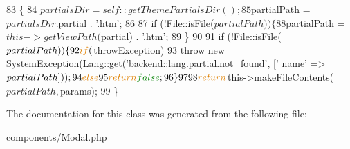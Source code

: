 \begin{DoxyCode}
83     \{   
84         $partialsDir = self::getThemePartialsDir();
85         $partialPath = $partialsDir . $partial . \textcolor{stringliteral}{'.htm'};
86 
87         \textcolor{keywordflow}{if} (!File::isFile($partialPath)) \{
88             $partialPath = $this->getViewPath($partial) . \textcolor{stringliteral}{'.htm'};
89         \}
90 
91         \textcolor{keywordflow}{if} (!File::isFile($partialPath)) \{
92             \textcolor{keywordflow}{if} ($throwException)
93                 \textcolor{keywordflow}{throw} \textcolor{keyword}{new} \hyperlink{namespaceSystemException}{SystemException}(Lang::get(\textcolor{stringliteral}{'backend::lang.partial.not\_found'}, [\textcolor{stringliteral}{'
      name'} => $partialPath]));
94             \textcolor{keywordflow}{else}
95                 \textcolor{keywordflow}{return} \textcolor{keyword}{false};
96         \}   
97 
98         \textcolor{keywordflow}{return} $this->makeFileContents($partialPath, $params);
99     \}   
\end{DoxyCode}


The documentation for this class was generated from the following file\+:\begin{DoxyCompactItemize}
\item 
components/Modal.\+php\end{DoxyCompactItemize}

